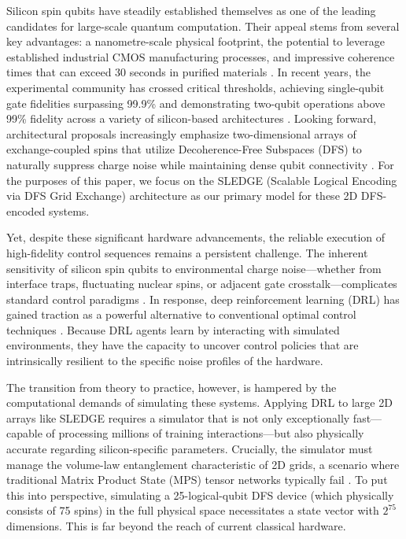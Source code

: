 \documentclass[preprint,12pt, a4paper]{elsarticle}
\begin{document}
Silicon spin qubits have steadily established themselves as one of the leading candidates for large-scale quantum computation. Their appeal stems from several key advantages: a nanometre-scale physical footprint, the potential to leverage established industrial CMOS manufacturing processes, and impressive coherence times that can exceed 30 seconds in purified materials \cite{zwanenburg2013silicon, muhonen2014storing}. In recent years, the experimental community has crossed critical thresholds, achieving single-qubit gate fidelities surpassing 99.9\% \cite{yoneda2018quantum} and demonstrating two-qubit operations above 99\% fidelity across a variety of silicon-based architectures \cite{noiri2022fast, xue2022quantum, mills2022two, madzik2022precision}. Looking forward, architectural proposals increasingly emphasize two-dimensional arrays of exchange-coupled spins that utilize Decoherence-Free Subspaces (DFS) to naturally suppress charge noise while maintaining dense qubit connectivity \cite{sledge2019}. For the purposes of this paper, we focus on the SLEDGE (Scalable Logical Encoding via DFS Grid Exchange) architecture as our primary model for these 2D DFS-encoded systems.

Yet, despite these significant hardware advancements, the reliable execution of high-fidelity control sequences remains a persistent challenge. The inherent sensitivity of silicon spin qubits to environmental charge noise---whether from interface traps, fluctuating nuclear spins, or adjacent gate crosstalk---complicates standard control paradigms \cite{connors2022charge}. In response, deep reinforcement learning (DRL) has gained traction as a powerful alternative to conventional optimal control techniques \cite{niu2019universal, fosel2018reinforcement}. Because DRL agents learn by interacting with simulated environments, they have the capacity to uncover control policies that are intrinsically resilient to the specific noise profiles of the hardware.

The transition from theory to practice, however, is hampered by the computational demands of simulating these systems. Applying DRL to large 2D arrays like SLEDGE requires a simulator that is not only exceptionally fast---capable of processing millions of training interactions---but also physically accurate regarding silicon-specific parameters. Crucially, the simulator must manage the volume-law entanglement characteristic of 2D grids, a scenario where traditional Matrix Product State (MPS) tensor networks typically fail \cite{schollwock2011density}. To put this into perspective, simulating a 25-logical-qubit DFS device (which physically consists of 75 spins) in the full physical space necessitates a state vector with $2^{75}$ dimensions. This is far beyond the reach of current classical hardware.
\end{document}

